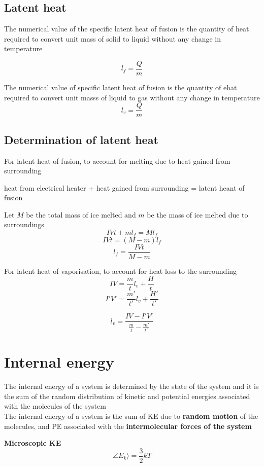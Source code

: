 \documentclass[a4paper, 10pt]{article}
\begin{document}
\subsection{Latent heat}
\begin{framed}
   The numerical value of the specific latent heat of fusion is the quantity of heat required to convert unit mass of solid to liquid without any change in temperature

   \[
   l_f = \frac{Q}{m}
   \]

   The numerical value of specific latent heat of fusion is the quantity of ehat required to convert unit masss of liquid to gas without any change in temperature 
   \[
   l_v = \frac{Q}{m}
   \]
\end{framed}	

\subsection{Determination of latent heat}
For latent heat of fusion, to account for melting due to heat gained from surrounding
\begin{center}
   heat from electrical heater + heat gained from surrounding = latent heant of fusion 
\end{center}	
Let $M$  be the total mass of ice melted and $m$ be the mass of ice melted due to surroundings
\[
IV t + ml_f = Ml_f
\]
\[
   IV t = (M-m) l_f
\]
\[
l_f = \frac{IVt}{M-m}
\]

For latent heat of vaporisation, to account for heat loss to the surrounding
\[
IV = \frac{m}{t}l_v + \frac{H}{t}
\]
\[
I'V' = \frac{m'}{t'}l_v + \frac{H'}{t'}
\]

\[
l_v = \frac{IV - I'V'}{\frac{m}{t} - \frac{m'}{t'}}
\]

\section{Internal energy}
\begin{framed}
   The internal energy of a system is determined by the state of the system and it is the sum of the random distribution of kinetic and potential energies associated with the molecules of the system \\
   The internal energy of a system is the sum of KE due to \textbf{random motion} of the molecules, and PE associated with the \textbf{intermolecular forces of the system}
\end{framed}	

\textbf{Microscopic KE}
\[
   \angle E_k \rangle = \frac{3}{2}kT
\]
\end{document}
